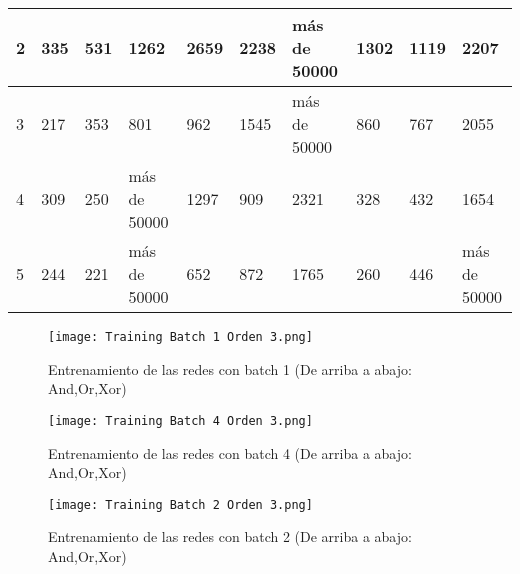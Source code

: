 \begin{table}[H]
\begin{tabular}{|l|lllllllll|}
    2                                                      & \multicolumn{1}{l|}{335}          & \multicolumn{1}{l|}{531}         & \multicolumn{1}{l|}{1262}         & \multicolumn{1}{l|}{2659}         & \multicolumn{1}{l|}{2238}        & \multicolumn{1}{l|}{más de 50000} & \multicolumn{1}{l|}{1302}         & \multicolumn{1}{l|}{1119}        & 2207         \\ \hline
    3                                                      & \multicolumn{1}{l|}{217}          & \multicolumn{1}{l|}{353}         & \multicolumn{1}{l|}{801}          & \multicolumn{1}{l|}{962}          & \multicolumn{1}{l|}{1545}        & \multicolumn{1}{l|}{más de 50000} & \multicolumn{1}{l|}{860}          & \multicolumn{1}{l|}{767}         & 2055         \\ \hline
    4                                                      & \multicolumn{1}{l|}{309}          & \multicolumn{1}{l|}{250}         & \multicolumn{1}{l|}{más de 50000} & \multicolumn{1}{l|}{1297}         & \multicolumn{1}{l|}{909}         & \multicolumn{1}{l|}{2321}         & \multicolumn{1}{l|}{328}          & \multicolumn{1}{l|}{432}         & 1654         \\ \hline
    5                                                      & \multicolumn{1}{l|}{244}          & \multicolumn{1}{l|}{221}         & \multicolumn{1}{l|}{más de 50000} & \multicolumn{1}{l|}{652}          & \multicolumn{1}{l|}{872}         & \multicolumn{1}{l|}{1765}         & \multicolumn{1}{l|}{260}          & \multicolumn{1}{l|}{446}         & más de 50000 \\ \hline
    \end{tabular}
    \end{table}
\begin{figure}[H]
    \centering
    \texttt{[image: Training Batch 1 Orden 3.png]}
    \caption{Entrenamiento de las redes con batch 1 (De arriba a abajo: And,Or,Xor)}
    \label{fig:TrainBatch1_Order3}
\end{figure}
\begin{figure}[H]
    \centering
    \texttt{[image: Training Batch 4 Orden 3.png]}
    \caption{Entrenamiento de las redes con batch 4 (De arriba a abajo: And,Or,Xor)}
    \label{fig:TrainBatch4_Order3}
\end{figure}
\begin{figure}[H]
    \centering
    \texttt{[image: Training Batch 2 Orden 3.png]}
    \caption{Entrenamiento de las redes con batch 2 (De arriba a abajo: And,Or,Xor)}
    \label{fig:TrainBatch2_Order3}
\end{figure}